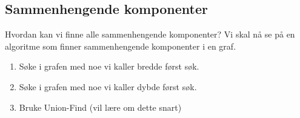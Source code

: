 \documentclass{article}
\begin{document}
    \subsection{Sammenhengende komponenter}
    Hvordan kan vi finne alle sammenhengende komponenter? Vi skal nå se på en algoritme som finner sammenhengende komponenter i en graf.

    \begin{enumerate}
        \item Søke i grafen med noe vi kaller bredde først søk.
        \item Søke i grafen med noe vi kaller dybde først søk.
        \item Bruke Union-Find (vil lære om dette snart)
    \end{enumerate}
\end{document}
